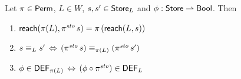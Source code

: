 \documentclass[12pt,a4paper]{report}
\newcommand{\ssto}{\nstyle{sto}}
\newcommand{\DEF}{\sstyle{DEF}}
\begin{document}
%

\begin{lemma} \label{lemma:Permutations_and_Reachability}
  Let $\pi \in \mathsf{Perm}$, $L \in W$, $s,s'\in\mathsf{Store}_L$ and $\phi:\mathsf{Store}\rightharpoonup\mathsf{Bool}$.
  Then
  \begin{enumerate}
    \item $\reach{\pi(L)}{\pi^\ssto\,s} = \pi\,(\reach{L}{s})$
    \item $s \equiv_L s' \,\Leftrightarrow\, (\pi^\ssto\,s) \equiv_{\pi(L)} (\pi^\ssto\,s')$
    \item $\phi \in \DEF_{\pi(L)} \,\Leftrightarrow\, (\phi \circ \pi^\ssto) \in \DEF_L$
  \end{enumerate}
\end{lemma}
\end{document}
